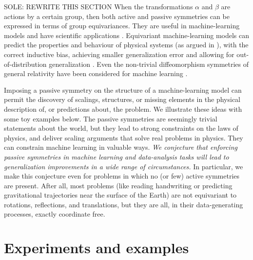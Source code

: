 \documentclass{article}
\theoremstyle{plain}
\theoremstyle{definition}
\theoremstyle{remark}
\newcommand{\bernhard}[1]{~B: \textcolor{red}{\textbf{#1}}}
\begin{document}


SOLE: REWRITE THIS SECTION
When the transformations $\alpha$ and $\beta$ are actions by a certain group, then both active and passive symmetries can be expressed in terms of group equivariances.
They are useful in machine-learning models \cite{cohen2016group, kondor2018convolution, thomas2018tensor, geiger2022e3nn, finzi2020generalizing, finzi2021practical} and have scientific applications \cite{batzner20223, musaelian2022learning, stark2022equibind, yu-physics, wang2022approximately}.
Equivariant machine-learning models can predict the properties and behaviour of physical systems (as argued in \citealt{cheng2019covariance}), with the correct inductive bias, achieving smaller generalization error \cite{bietti2021sample, elesedy2021provably, elesedy2021kernel, mei2021learning} and allowing for out-of-distribution generalization \cite{villar2022dimensionless}. 
Even the non-trivial diffeomorphism symmetries of general relativity have been considered for machine learning \cite{weiler}.


Imposing a passive symmetry on the structure of a machine-learning model can permit the discovery of scalings, structures, or missing elements in the physical description of, or predictions about, the problem.
We illustrate these ideas with some toy examples below.
The passive symmetries are seemingly trivial statements about the world, but they lead to strong constraints on the laws of physics, and deliver scaling arguments that solve real problems in physics.
They can constrain machine learning in valuable ways.
\emph{We conjecture that enforcing passive symmetries in machine learning and data-analysis tasks will lead to generalization improvements in a wide range of circumstances.}
In particular, we make this conjecture even for problems in which no (or few) active symmetries are present.
After all, most problems (like reading handwriting or predicting gravitational trajectories near the surface of the Earth) are not equivariant to rotations, reflections, and translations, but they are all, in their data-generating processes, exactly coordinate free.

\section{Experiments and examples}\label{sec:experiments}
\end{document}

